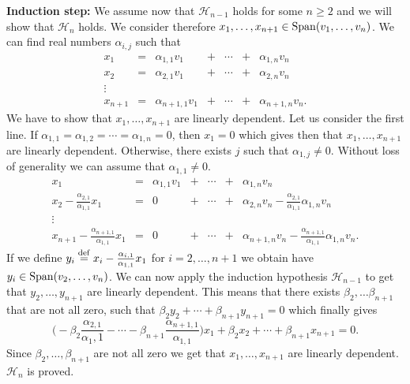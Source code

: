 \documentclass[11pt,nocut]{article}
\begin{document}
\noindent\textbf{Induction step:} We assume now that $\mathcal{H}_{n-1}$ holds for some $n \geq 2$ and we will show that $\mathcal{H}_{n}$ holds. We consider therefore $x_1, \dots, x_{n+1} \in {{\rm Span}}(v_1, \dots, v_n)$. We can find real numbers $\alpha_{i,j}$ such that
$$
\begin{array}{ccccccc}
	x_1 &=& \alpha_{1,1} v_1 &+& \cdots &+& \alpha_{1,n} v_n\\
	x_2 &=& \alpha_{2,1} v_1 &+& \cdots &+& \alpha_{2,n} v_n \\
	\vdots &&&&&& \\
	x_{n+1} &=& \alpha_{n+1,1} v_1 &+& \cdots &+& \alpha_{n+1,n} v_n.
\end{array}
$$
We have to show that $x_1, \dots, x_{n+1}$ are linearly dependent.
Let us consider the first line. If $\alpha_{1,1} = \alpha_{1,2} = \cdots = \alpha_{1,n} = 0$, then $x_1 = 0$ which gives then that $x_1, \dots, x_{n+1}$ are linearly dependent.
Otherwise, there exists $j$ such that $\alpha_{1,j} \neq 0$. Without loss of generality we can assume that $\alpha_{1,1} \neq 0$. 
$$
\begin{array}{ccccccc}
	x_1 &=& \alpha_{1,1} v_1 &+& \cdots &+& \alpha_{1,n} v_n\\
	x_2 - \frac{\alpha_{2,1}}{\alpha_{1,1}} x_1 &=& 0 &+& \cdots &+& \alpha_{2,n} v_n - \frac{\alpha_{2,1}}{\alpha_{1,1}} \alpha_{1,n}v_n \\
	\vdots &&&&&& \\
	x_{n+1} - \frac{\alpha_{n+1,1}}{\alpha_{1,1}} x_1&=& 0 &+& \cdots &+& \alpha_{n+1,n} v_n- \frac{\alpha_{n+1,1}}{\alpha_{1,1}} \alpha_{1,n}v_n.
\end{array}
$$
If we define $y_i \overset{\rm def}{=} x_i - \frac{\alpha_{i,1}}{\alpha_{1,1}} x_1$ for $i = 2, \dots, n+1$ we obtain have $y_i \in {{\rm Span}}(v_2, \dots, v_{n})$. We can now apply the induction hypothesis $\mathcal{H}_{n-1}$ to get that $y_2, \dots, y_{n+1}$ are linearly dependent. This means that there exists $\beta_2, \dots \beta_{n+1}$ that are not all zero, such that $\beta_2 y_2 + \cdots + \beta_{n+1} y_{n+1} = 0$ which finally gives
$$
\Big(- \beta_2 \frac{\alpha_{2,1}}{\alpha_1,1} - \cdots - \beta_{n+1} \frac{\alpha_{n+1,1}}{\alpha_{1,1}}\Big) x_1 + \beta_2 x_2 + \cdots + \beta_{n+1} x_{n+1} = 0.
$$
Since $\beta_2, \dots, \beta_{n+1}$ are not all zero we get that $x_1, \dots, x_{n+1}$ are linearly dependent. $\mathcal{H}_{n}$ is proved.

\vspace{1cm}
\centerline{}

%
%
\end{document}
